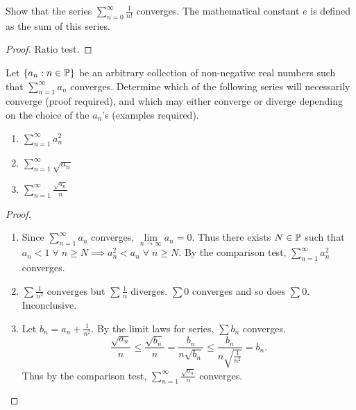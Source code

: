 \documentclass[12pt]{article}
\begin{document}
\begin{problem}
    Show that the series $\sum\limits_{n=0}^{\infty} \frac{1}{n!}$ converges.
    The mathematical constant $e$ is defined as the sum of this series.
\end{problem}
\begin{proof}
    Ratio test.
\end{proof}

\begin{problem}
    Let $\set{a_{n} : n \in \P}$ be an arbitrary collection of non-negative real numbers such that $\sum\limits_{n=1}^{\infty} a_{n}$ converges.
    Determine which of the following series will necessarily converge (proof required), and which may either converge or diverge depending on the choice of the $a_{n}$'s (examples required).
    \begin{enumerate}[label=(\alph*)]
        \item $\sum\limits_{n=1}^{\infty} a_{n}^{2}$
        \item $\sum\limits_{n=1}^{\infty} \sqrt{a_{n}}$
        \item $\sum\limits_{n=1}^{\infty} \frac{\sqrt{a_{n}}}{n}$
    \end{enumerate}
\end{problem}

\begin{proof}
    \begin{enumerate}[label=(\alph*)]
        \item Since $\sum_{n=1}^{\infty} a_{n}$ converges, $\lim\limits_{n \to \infty} a_{n} = 0$. Thus there exists $N \in \P$ such that $a_{n} < 1 \;\forall\; n \geq N \implies a_{n}^{2} < a_{n} \;\forall\; n \geq N$. By the comparison test, $\sum_{n=1}^{\infty} a_{n}^{2}$ converges.

        \item $\sum \frac{1}{n^{2}}$ converges but $\sum \frac{1}{n}$ diverges. $\sum 0$ converges and so does $\sum 0$. Inconclusive.

        \item Let $b_{n} = a_{n} + \frac{1}{n^{2}}$. By the limit laws for series, $\sum b_{n}$ converges. \[
            \frac{\sqrt{a_{n}}}{n} \leq \frac{\sqrt{b_{n}}}{n} = \frac{b_{n}}{n \sqrt{b_{n}}} \leq \frac{b_{n}}{n \sqrt{\frac{1}{n^{2}}}} = b_{n}.
        \] Thus by the comparison test, $\sum\limits_{n=1}^{\infty} \frac{\sqrt{a_{n}}}{n}$ converges. \qedhere
    \end{enumerate}
\end{proof}
\end{document}
